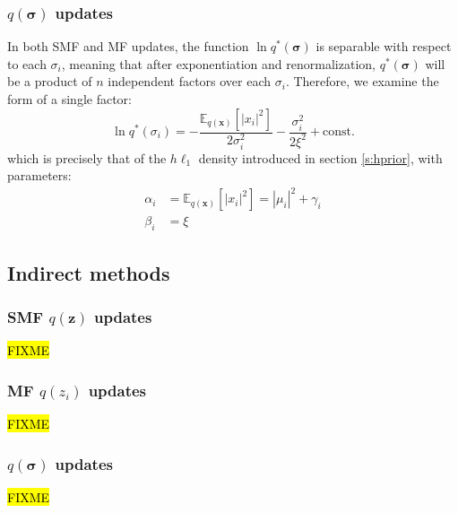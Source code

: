 \documentclass{article}
\newcommand{\m}[1]{\boldsymbol{#1}}
\newcommand{\E}[2]{\mathbb{E}_{#2}\left[ #1 \right]}
\begin{document}
\subsubsection{$q(\m{\sigma})$ updates}
In both SMF and MF updates, the function $\ln q^*(\m{\sigma})$ is separable
with respect to each $\sigma_i$, meaning that after exponentiation and
renormalization, $q^*(\m{\sigma})$ will be a product of $n$ independent
factors over each $\sigma_i$. Therefore, we examine the form of a
single factor:
\begin{equation*}
\ln q^*(\sigma_i) =
 -\frac{\E{|x_i|^2}{q(\m{x})}}{2 \sigma_i^2}
 -\frac{\sigma_i^2}{2 \xi^2}
 +\text{const.}
\end{equation*}
which is precisely that of the $h\ell_1$ density introduced in section
\ref{s:hprior}, with parameters:
\begin{equation*}
\begin{aligned}
\alpha_i &= \E{|x_i|^2}{q(\m{x})} = |\mu_i|^2 + \gamma_i
\\
\beta_i &= \xi
\end{aligned}
\end{equation*}

\subsection{Indirect methods}
\label{ss:var_indirect}

\subsubsection{SMF $q(\m{z})$ updates}
\hl{FIXME}

\subsubsection{MF $q(z_i)$ updates}
\hl{FIXME}

\subsubsection{$q(\m{\sigma})$ updates}
\hl{FIXME}

\end{document}
